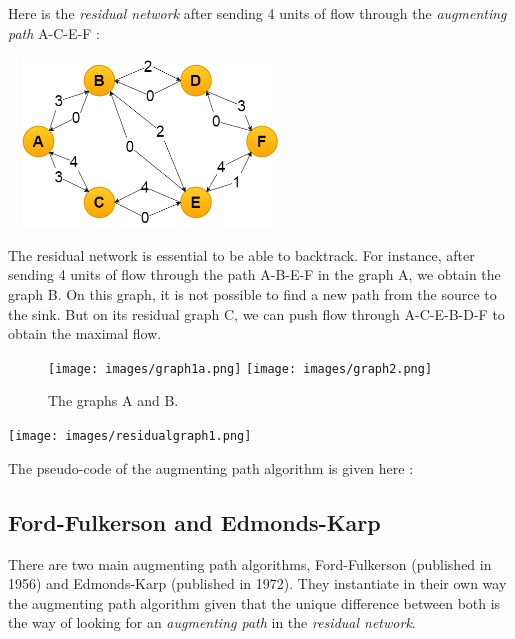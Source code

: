 Here is the \textit{residual network} after sending 4 units of flow through the \textit{augmenting path} A-C-E-F : \newline

\begin{center}
\includegraphics[width=7.5cm,height=4.5cm]{images/residualgraph2.png}
\end{center}

The residual network is essential to be able to backtrack. For instance, after sending 4 units of flow through the path A-B-E-F in the graph A, we obtain the graph B. On this graph, it is not possible to find a new path from the source to the sink. But on its residual graph C, we can push flow through A-C-E-B-D-F to obtain the maximal flow.

\begin{figure}[!h]
\texttt{[image: images/graph1a.png]}\hfill
\texttt{[image: images/graph2.png]}
\caption{The graphs A and B.}
\end{figure}

\begin{center}
\texttt{[image: images/residualgraph1.png]}
\end{center}

\newpage
The pseudo-code of the augmenting path algorithm is given here :

\begin{algorithm}[h]

\end{algorithm}

\subsection{Ford-Fulkerson and Edmonds-Karp}
There are two main augmenting path algorithms, Ford-Fulkerson (published in 1956) and Edmonds-Karp (published in 1972). They instantiate in their own way the augmenting path algorithm given that the unique difference between both is the way of looking for an \textit{augmenting path} in the \textit{residual network}. \newline


